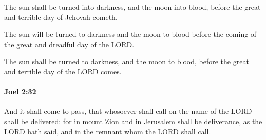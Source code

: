 			\begin{versebox}
					\item[BHS] 
					\item[LXX] 
					\item[ASV] The sun shall be turned into darkness, and the moon into blood, before the great and terrible day of Jehovah cometh.
					\item[NIV] The sun will be turned to darkness and the moon to blood before the coming of the great and dreadful day of the LORD.
					\item[NRSV] The sun shall be turned to darkness, and the moon to blood, before the great and terrible day of the LORD comes.
			\end{versebox}

		\paragraph{Joel 2:32} %
			\label{JOEL-2-32}

			And it shall come to pass, that whosoever shall call on the name of the LORD shall be delivered: for in mount Zion and in Jerusalem shall be deliverance, as the LORD hath said, and in the remnant whom the LORD shall call.

